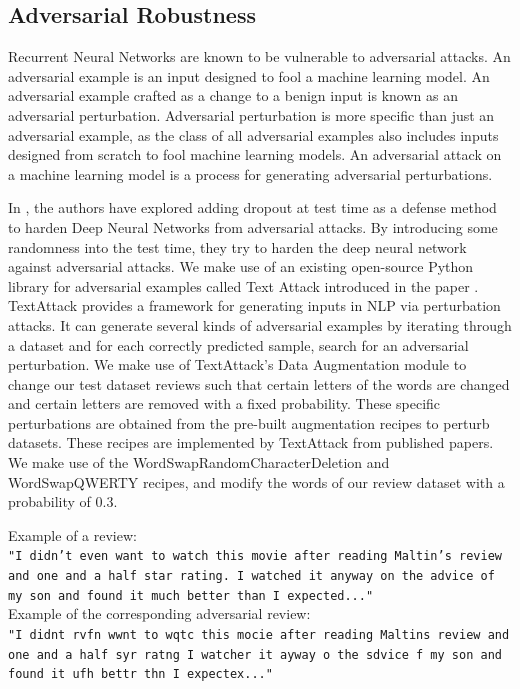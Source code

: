 \documentclass{article}
\begin{document}
\subsection{Adversarial Robustness}

Recurrent Neural Networks are known to be vulnerable to adversarial attacks. An adversarial example is an input designed to fool a machine learning model. An adversarial example crafted as a change to a benign input is known as an adversarial perturbation. Adversarial perturbation is more specific than just an adversarial example, as the class of all adversarial examples also includes inputs designed from scratch to fool machine learning models. An adversarial attack on a machine learning model is a process for generating adversarial perturbations. 


In \cite{DBLP:journals/corr/abs-1809-05165}, the authors have explored adding dropout at test time as a defense method to harden Deep Neural Networks from adversarial attacks. By introducing some randomness into the test time, they try to harden the deep neural network against adversarial attacks. We make use of an existing open-source Python library for adversarial examples called Text Attack introduced in the paper \cite{morris2020textattack}. TextAttack provides a framework for generating inputs in NLP via perturbation attacks. It can generate several kinds of adversarial examples by iterating through a dataset and for each correctly predicted sample, search for an adversarial perturbation. We make use of TextAttack's Data Augmentation module to change our test dataset reviews such that certain letters of the words are changed and certain letters are removed with a fixed probability. These specific perturbations are obtained from the pre-built augmentation recipes to perturb datasets. These recipes are implemented by TextAttack from published papers. We make use of the WordSwapRandomCharacterDeletion and WordSwapQWERTY recipes, and modify the words of our review dataset with a probability of 0.3. 

Example of a review: \\
\texttt{"I didn't even want to watch this movie after reading Maltin's review and one and a half star rating. I watched it anyway on the advice of my son and found it much better than I expected..."}
\\Example of the corresponding adversarial review:
\\\texttt{"I didnt rvfn wwnt to wqtc this mocie after reading Maltins review and one and a half syr ratng I watcher it ayway o the sdvice f my son and found it ufh bettr thn I expectex..."}
\end{document}
